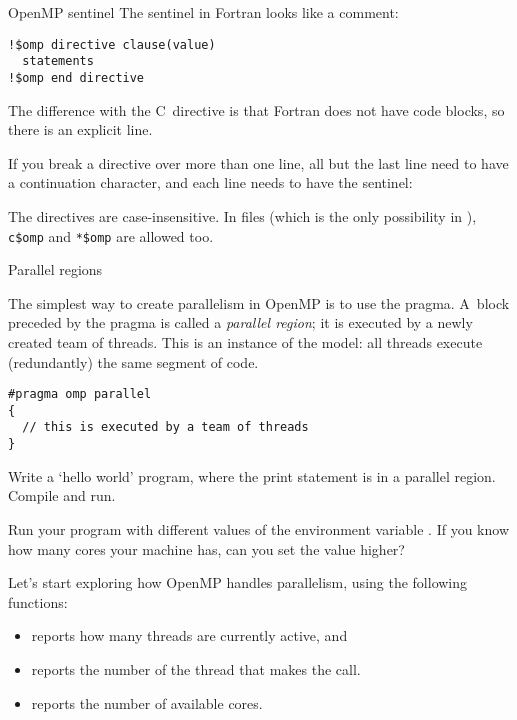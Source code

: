 \begin{fortrannote}{OpenMP sentinel}
The sentinel in Fortran looks like a comment:
\begin{lstlisting}
!$omp directive clause(value)
  statements
!$omp end directive
\end{lstlisting}
The difference with the C~directive is that
Fortran does not have code blocks, so there is an explicit
 line.

If you break a directive over more than one line, all but the last line
need to have a continuation character, and each line needs to have the sentinel:
%

The directives are case-insensitive.
In
 files
(which is the only possibility in ),
\verb+c$omp+ and \verb+*$omp+ are allowed too.
\end{fortrannote}


 {Parallel regions}

The simplest way to create parallelism in OpenMP is to use
the  pragma.
A~block preceded by the  pragma
is called a \emph{parallel region}; it
is executed by a newly created team of threads.
This is an instance of the  model:
all threads execute (redundantly) the same segment of code.
\begin{lstlisting}
#pragma omp parallel
{
  // this is executed by a team of threads
}
\end{lstlisting}

\begin{exercise}
  \label{ex:omp-helloworld}
  Write a `hello world' program, where the
  print statement is in a parallel region.
  Compile and run.

  Run your program with different values of the environment variable
  .
  If you know how many cores your machine has,
  can you set the value higher?
\end{exercise}

Let's start exploring how OpenMP handles parallelism,
using the following functions:
\begin{itemize}
\item {} reports how many threads are
  currently active, and
\item {} reports the number of the
  thread that makes the call.
\item {} reports the number of available
  cores.
\end{itemize}

